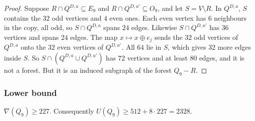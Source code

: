 \begin{proof}
Suppose $R\cap Q^{D,a}\subseteq E_9$ and $R\cap Q^{D,a'}\subseteq O_9$, and let $S=V\setminus R$. In
$Q^{D,a}$, $S$ contains the $32$ odd vertices and $4$ even ones. Each even vertex has $6$
neighbours in the copy, all odd, so $S\cap Q^{D,a}$ spans $24$ edges. Likewise
$S\cap Q^{D,a'}$ has $36$ vertices and spans $24$ edges. The map $x\mapsto x\oplus e_j$ sends the
$32$ odd vertices of $Q^{D,a}$ onto the $32$ even vertices of $Q^{D,a'}$. All $64$ lie in $S$, which
gives $32$ more edges inside $S$. So $S\cap(Q^{D,a}\cup Q^{D,a'})$ has $72$ vertices and at least
$80$ edges, and it is not a forest. But it is an induced subgraph of the forest $Q_9-R$.
\end{proof}

\subsubsection{Lower bound}\label{p2c5:sec:lower}

\begin{theorem}\label{p2c5:thm:main}
$\nabla(Q_9)\ge227$. Consequently $U(Q_9)\ge512+8\cdot227=2328$.
\end{theorem}

